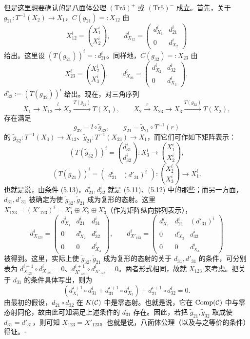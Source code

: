 但是这里想要确认的是八面体公理 $(\mathrm{Tr}5)^+$ 或 $(\mathrm{Tr}5)^-$ 成立。首先，关于 $g_{21}\colon T^{-1}(X_2)\to X_1$，$C(g_{21}) =: X_{12}$ 由
\begin{equation}
X_{12}^i = \binom{X_1^i}{X_2^i},\qquad
d^i_{X_{12}} = \begin{pmatrix} d^i_{X_1} & d^i_{21} \\ 0 & d^i_{X_2}\end{pmatrix} \tag{5.11}
\end{equation}
给出。这里设 $(T(g_{21}))^i =: d^i_{21}$。同样地，$C(g_{32}) =: X_{23}$ 由
\begin{equation}
X_{23}^i = \binom{X_2^i}{X_3^i},\qquad
d^i_{X_{23}} = \begin{pmatrix} d^i_{X_2} & d^i_{32} \\ 0 & d^i_{X_3}\end{pmatrix}, \tag{5.12}
\end{equation}
$d^i_{32} := (T(g_{32}))^i$ 给出。现在，对三角序列
\[
X_1\to X_{12}\xrightarrow{\,l\,}X_2\xrightarrow{T(g_{21})}T(X_1),\qquad
X_2\xrightarrow{\,r\,}X_{23}\to X_3\xrightarrow{T(g_{32})}T(X_2),
\]
存在满足
\begin{equation}
g_{32} = l\circ\tilde g_{32},\qquad g_{21} = \tilde g_{21}\circ T^{-1}(r) \tag{5.13}
\end{equation}
的 $\tilde g_{32}\colon T^{-1}(X_3)\to X_{12}$、$\tilde g_{21}\colon T^{-1}(X_{23})\to X_1$，而它们可作如下矩阵表示：
\[
(T(\tilde g_{32}))^i = \binom{d^i_{31}}{d^i_{32}}\colon X_3^i\longrightarrow\binom{X_1^i}{X_2^i},
\]
\[
(T(\tilde g_{21}))^i = \begin{pmatrix} d^i_{21} & (d'_{31})^i\end{pmatrix}\colon \binom{X_2^i}{X_3^i}\longrightarrow X_1^i.
\]
也就是说，由条件 (5.13)，$d^i_{21},d^i_{32}$ 就是 (5.11)、(5.12) 中的那些；而另一方面，$d_{31},d'_{31}$ 被确定为使 $\tilde g_{32},\tilde g_{21}$ 成为复形的态射。这里 $X^i_{123} = (X'_{123})^i = X_1^i\oplus X_2^i\oplus X_3^i$（作为矩阵纵向排列表示），
\[
d^i_{X_{123}} = \begin{pmatrix} d^i_{X_1} & d^i_{21} & d^i_{31} \\ 0 & d^i_{X_2} & d^i_{32} \\ 0 & 0 & d^i_{X_3}\end{pmatrix},\qquad
d^i_{X'_{123}} = \begin{pmatrix} d^i_{X_1} & d^i_{21} & (d'_{31})^i \\ 0 & d^i_{X_2} & d^i_{32} \\ 0 & 0 & d^i_{X_3}\end{pmatrix}
\]
被得到。这里，实际上使 $\tilde g_{32},\tilde g_{21}$ 成为复形的态射的关于 $d_{31},d'_{31}$ 的条件，可分别表为 $d^{i+1}_{X_{123}}\circ d^i_{X_{123}}=0$、$d^{i+1}_{X'_{123}}\circ d^i_{X'_{123}}=0$。两者形式相同，故就 $X_{123}$ 来考虑。把关于 $d_{31}$ 的条件具体写出，则为
\[
(d^{i+1}_{X_1}\circ d^i_{31} + d^{i+1}_{31}\circ d^i_{X_3}) + d^{i+1}_{21}\circ d^i_{32} = 0.
\]
由最初的假设，$d_{21}\circ d_{32}$ 在 $K(\mathcal{C})$ 中是零态射。也就是说，它在 $\operatorname{Comp}(\mathcal{C})$ 中与零态射同伦，故由此可知满足上述条件的 $d_{31}$ 存在。因此，若把 $\tilde g_{21},\tilde g_{32}$ 取成使 $d_{31}=d'_{31}$，则可知 $X_{123}=X'_{123}$。也就是说，八面体公理（以及与之等价的条件）得证。\hfill$\square$

